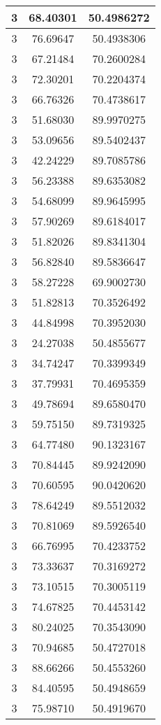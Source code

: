 \documentclass[
]{book}
\begin{document}
\begin{tabular}{c|c|c}
\hline
3 & 68.40301 & 50.4986272\\
\hline
3 & 76.69647 & 50.4938306\\
\hline
3 & 67.21484 & 70.2600284\\
\hline
3 & 72.30201 & 70.2204374\\
\hline
3 & 66.76326 & 70.4738617\\
\hline
3 & 51.68030 & 89.9970275\\
\hline
3 & 53.09656 & 89.5402437\\
\hline
3 & 42.24229 & 89.7085786\\
\hline
3 & 56.23388 & 89.6353082\\
\hline
3 & 54.68099 & 89.9645995\\
\hline
3 & 57.90269 & 89.6184017\\
\hline
3 & 51.82026 & 89.8341304\\
\hline
3 & 56.82840 & 89.5836647\\
\hline
3 & 58.27228 & 69.9002730\\
\hline
3 & 51.82813 & 70.3526492\\
\hline
3 & 44.84998 & 70.3952030\\
\hline
3 & 24.27038 & 50.4855677\\
\hline
3 & 34.74247 & 70.3399349\\
\hline
3 & 37.79931 & 70.4695359\\
\hline
3 & 49.78694 & 89.6580470\\
\hline
3 & 59.75150 & 89.7319325\\
\hline
3 & 64.77480 & 90.1323167\\
\hline
3 & 70.84445 & 89.9242090\\
\hline
3 & 70.60595 & 90.0420620\\
\hline
3 & 78.64249 & 89.5512032\\
\hline
3 & 70.81069 & 89.5926540\\
\hline
3 & 66.76995 & 70.4233752\\
\hline
3 & 73.33637 & 70.3169272\\
\hline
3 & 73.10515 & 70.3005119\\
\hline
3 & 74.67825 & 70.4453142\\
\hline
3 & 80.24025 & 70.3543090\\
\hline
3 & 70.94685 & 50.4727018\\
\hline
3 & 88.66266 & 50.4553260\\
\hline
3 & 84.40595 & 50.4948659\\
\hline
3 & 75.98710 & 50.4919670\\

\end{tabular}
\end{document}

